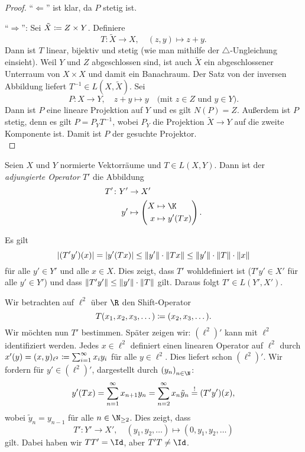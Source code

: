 \begin{proof}
    \enquote{$\Leftarrow$} ist klar, da $P$ stetig ist.
    
    \enquote{$\Rightarrow$}: Sei $\tilde X \defeq Z\times Y$. Definiere
    \[ T\colon\tilde X\to X, \quad (z,y)\mapsto z+y  . \]
    Dann ist $T$ linear, bijektiv und stetig (wie man mithilfe der
    $\scriptstyle\triangle$-Ungleichung einsieht). Weil $Y$ und $Z$
    abgeschlossen sind, ist auch $\tilde X$ ein abgeschlossener Unterraum von
    $X\times X$ und damit ein Banachraum.  Der Satz von der inversen Abbildung
     liefert $T^{-1}\in L(X,\tilde X)$. Sei
    \[ P\colon X\to Y,\quad z+y \mapsto y
        \quad\text{(mit $z\in Z$ und $y\in Y$)}
    . \]
    Dann ist $P$ eine lineare Projektion auf $Y$ und es gilt $N(P)=Z$. Außerdem
    ist $P$ stetig, denn es gilt $P = P_Y T^{-1}$, wobei $P_Y$ die Projektion
    $\tilde X\to Y$ auf die zweite Komponente ist. Damit ist $P$ der gesuchte
    Projektor.
    \\
\end{proof}

\begin{thDef}
    Seien $X$ und $Y$ normierte Vektorräume und $T\in L(X,Y)$.
    Dann ist der \emph{adjungierte Operator $T'$} die Abbildung
    \begin{align*}
        T'\colon Y' &\to X' \\
        y' &\mapsto \left( 
            \begin{aligned}
                X &\mapsto \K   \\
                x &\mapsto y'(Tx)   
            \end{aligned}
        \right)
    . \end{align*}
\end{thDef}

\nnBemerkung
Es gilt
\[ \abs{(T'y')(x)} = \abs{y'(Tx)} \leq \norm{y'} \cdot \norm{Tx}
    \leq \norm{y'} \cdot \norm{T}\cdot \norm{x}
\]
für alle $y'\in Y'$ und alle $x\in X$. Dies zeigt, dass $T'$ wohldefiniert ist
($T'y' \in X'$ für alle $y'\in Y'$) und dass $\norm{T'y'} \leq \norm{y'}\cdot
\norm{T}$ gilt. Daraus folgt $T'\in L(Y',X')$.

\begin{thBeispiel}
    Wir betrachten auf $\ell^2$ über $\R$ den Shift-Operator
    \[ T(x_1,x_2,x_3,\dots) \defeq (x_2,x_3,\dots)  . \]
    Wir möchten nun $T'$ bestimmen.
    Später zeigen wir: $(\ell^2)'$ kann mit $\ell^2$ identifiziert werden. Jedes
    $x\in\ell^2$ definiert einen linearen Operator auf $\ell^2$ durch
    $x'(y) = (x,y)_{\ell^2} \defeq \isum^\infty x_iy_i$ für alle $y\in\ell^2$. 
    Dies liefert schon $(\ell^2)'$.
    Wir fordern für $y'\in(\ell^2)'$, dargestellt durch $\nSeq y$:
    \[ y'(Tx) = \nsum^\infty x_{n+1}y_n = \nsum[2]^\infty x_n\tilde y_n
        \overset!= (T'y')(x)
    , \]
    wobei $\tilde y_n = y_{n-1}$ für alle $n\in\N_{\geq 2}$. Dies zeigt, dass
    \[ T'\colon Y'\to X', \quad (y_1,y_2,\dots) \mapsto (0,y_1,y_2,\dots) \]
    gilt. Dabei haben wir $TT' = \Id$, aber $T'T\neq\Id$.
    
\end{thBeispiel}


